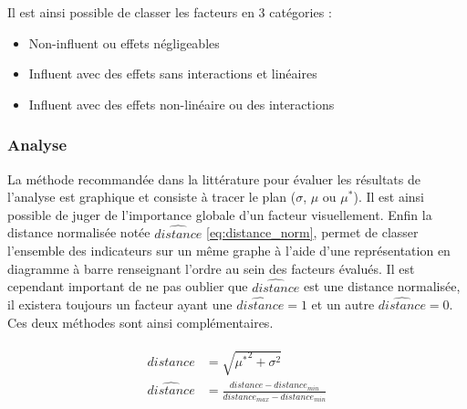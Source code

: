 Il est ainsi possible de classer les facteurs en 3 catégories :
\begin{itemize}
  \item Non-influent ou effets négligeables
  \item Influent avec des effets sans interactions et linéaires
  \item Influent avec des effets non-linéaire ou des interactions
\end{itemize}


\subsubsection{Analyse} %
\label{ssub:analyse}
La méthode recommandée dans la littérature pour évaluer les résultats de l’analyse
est graphique et consiste à tracer le plan ($\sigma$, $\mu$ ou $\mu^{*}$). Il est
ainsi possible de juger de l’importance globale d’un facteur visuellement.
Enfin la distance normalisée notée $\hat{distance}$ \eqref{eq:distance_norm}, permet
de classer l’ensemble des indicateurs sur un même graphe à l’aide d’une représentation
en diagramme à barre renseignant l’ordre au sein des facteurs évalués.
Il est cependant important de ne pas oublier que $\hat{distance}$ est une distance
normalisée, il existera toujours un facteur ayant une $\hat{distance} = 1$ et un autre
$\hat{distance} = 0$. Ces deux méthodes sont ainsi complémentaires.

\begin{align}\label{eq:distance_norm}
    \begin{split}
        distance        &= \sqrt{{\mu^{*}}^2 + \sigma^{2}} \\
        \hat{distance}  &=  \frac{distance - distance_{min}}{distance_{max} - distance_{min}}
    \end{split}
\end{align}






































